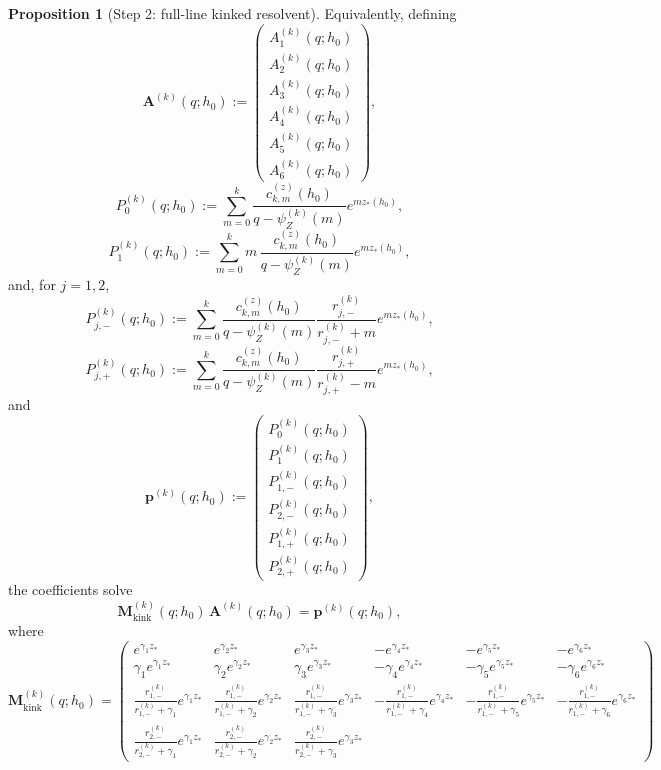 \documentclass{article}
\theoremstyle{definition}
\newtheorem{proposition}{Proposition}[section]
\begin{document}
\begin{proposition}[Step 2: full-line kinked resolvent]
Equivalently, defining
\[
\mathbf A^{(k)}(q;h_0):=
\begin{pmatrix}
A_1^{(k)}(q;h_0)\\
A_2^{(k)}(q;h_0)\\
A_3^{(k)}(q;h_0)\\
A_4^{(k)}(q;h_0)\\
A_5^{(k)}(q;h_0)\\
A_6^{(k)}(q;h_0)
\end{pmatrix},
\]
\[
P_0^{(k)}(q;h_0):=
\sum_{m=0}^{k}\frac{c_{k,m}^{(z)}(h_0)}{q-\psi_Z^{(k)}(m)}e^{mz_*(h_0)},
\]
\[
P_1^{(k)}(q;h_0):=
\sum_{m=0}^{k}m\,\frac{c_{k,m}^{(z)}(h_0)}{q-\psi_Z^{(k)}(m)}e^{mz_*(h_0)},
\]
and, for $j=1,2$,
\[
P_{j,-}^{(k)}(q;h_0):=
\sum_{m=0}^{k}\frac{c_{k,m}^{(z)}(h_0)}{q-\psi_Z^{(k)}(m)}
\frac{r_{j,-}^{(k)}}{r_{j,-}^{(k)}+m}e^{mz_*(h_0)},
\]
\[
P_{j,+}^{(k)}(q;h_0):=
\sum_{m=0}^{k}\frac{c_{k,m}^{(z)}(h_0)}{q-\psi_Z^{(k)}(m)}
\frac{r_{j,+}^{(k)}}{r_{j,+}^{(k)}-m}e^{mz_*(h_0)},
\]
and
\[
\mathbf p^{(k)}(q;h_0):=
\begin{pmatrix}
P_0^{(k)}(q;h_0)\\
P_1^{(k)}(q;h_0)\\
P_{1,-}^{(k)}(q;h_0)\\
P_{2,-}^{(k)}(q;h_0)\\
P_{1,+}^{(k)}(q;h_0)\\
P_{2,+}^{(k)}(q;h_0)
\end{pmatrix},
\]
the coefficients solve
\[
\mathbf M_{\mathrm{kink}}^{(k)}(q;h_0)\,\mathbf A^{(k)}(q;h_0)=\mathbf p^{(k)}(q;h_0),
\]
where
\[
\mathbf M_{\mathrm{kink}}^{(k)}(q;h_0)=
\begin{pmatrix}
e^{\gamma_1 z_*} & e^{\gamma_2 z_*} & e^{\gamma_3 z_*} & -e^{\gamma_4 z_*} & -e^{\gamma_5 z_*} & -e^{\gamma_6 z_*}\\
\gamma_1 e^{\gamma_1 z_*} & \gamma_2 e^{\gamma_2 z_*} & \gamma_3 e^{\gamma_3 z_*}
& -\gamma_4 e^{\gamma_4 z_*} & -\gamma_5 e^{\gamma_5 z_*} & -\gamma_6 e^{\gamma_6 z_*}\\
\frac{r_{1,-}^{(k)}}{r_{1,-}^{(k)}+\gamma_1}e^{\gamma_1 z_*} &
\frac{r_{1,-}^{(k)}}{r_{1,-}^{(k)}+\gamma_2}e^{\gamma_2 z_*} &
\frac{r_{1,-}^{(k)}}{r_{1,-}^{(k)}+\gamma_3}e^{\gamma_3 z_*} &
-\frac{r_{1,-}^{(k)}}{r_{1,-}^{(k)}+\gamma_4}e^{\gamma_4 z_*} &
-\frac{r_{1,-}^{(k)}}{r_{1,-}^{(k)}+\gamma_5}e^{\gamma_5 z_*} &
-\frac{r_{1,-}^{(k)}}{r_{1,-}^{(k)}+\gamma_6}e^{\gamma_6 z_*}\\
\frac{r_{2,-}^{(k)}}{r_{2,-}^{(k)}+\gamma_1}e^{\gamma_1 z_*} &
\frac{r_{2,-}^{(k)}}{r_{2,-}^{(k)}+\gamma_2}e^{\gamma_2 z_*} &
\frac{r_{2,-}^{(k)}}{r_{2,-}^{(k)}+\gamma_3}e^{\gamma_3 z_*} &

\end{pmatrix}\]
\end{proposition}
\end{document}
